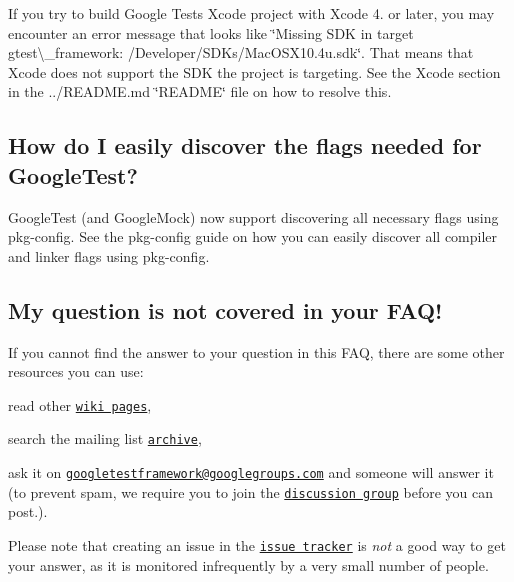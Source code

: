 If you try to build Google Test\textquotesingle{}s Xcode project with Xcode 4. or later, you may encounter an error message that looks like \char`\"{}\+Missing S\+D\+K in target gtest\textbackslash{}\+\_\+framework\+: /\+Developer/\+S\+D\+Ks/\+Mac\+O\+S\+X10.\+4u.\+sdk\char`\"{}. That means that Xcode does not support the S\+DK the project is targeting. See the Xcode section in the ../\+R\+E\+A\+D\+ME.md \char`\"{}\+R\+E\+A\+D\+M\+E\char`\"{} file on how to resolve this.

\subsection*{How do I easily discover the flags needed for Google\+Test?}

Google\+Test (and Google\+Mock) now support discovering all necessary flags using pkg-\/config. See the pkg-\/config guide on how you can easily discover all compiler and linker flags using pkg-\/config.

\subsection*{My question is not covered in your F\+A\+Q!}

If you cannot find the answer to your question in this F\+AQ, there are some other resources you can use\+:


\begin{DoxyEnumerate}
\item read other \href{../docs}{\tt wiki pages},
\end{DoxyEnumerate}
\begin{DoxyEnumerate}
\item search the mailing list \href{https://groups.google.com/forum/#!forum/googletestframework}{\tt archive},
\end{DoxyEnumerate}
\begin{DoxyEnumerate}
\item ask it on \href{mailto:googletestframework@googlegroups.com}{\tt googletestframework@googlegroups.\+com} and someone will answer it (to prevent spam, we require you to join the \href{http://groups.google.com/group/googletestframework}{\tt discussion group} before you can post.).
\end{DoxyEnumerate}

Please note that creating an issue in the \href{https://github.com/google/googletest/issues}{\tt issue tracker} is {\itshape not} a good way to get your answer, as it is monitored infrequently by a very small number of people.

